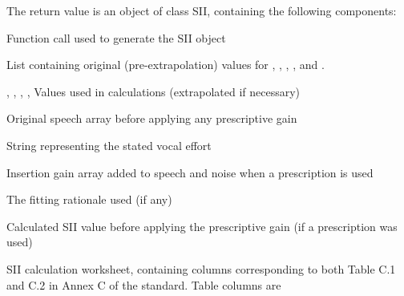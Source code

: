\documentclass[letterpaper]{book}
\begin{document}
\begin{Value}
The return value is an object of class SII, containing the following
components:
\begin{ldescription}
\item[\code{call}] Function call used to generate the SII object
\item[\code{orig}] List containing original (pre-extrapolation) values for
, , , , and
.
\item[\code{speech}, \code{noise}, \code{threshold}, \code{loss}, \code{and freq}] Values used in
calculations (extrapolated if necessary)
\item[\code{unaided\_speech}] Original speech array before applying any prescriptive gain
\item[\code{vocal\_effort}] String representing the stated vocal effort
\item[\code{gain}] Insertion gain array added to speech and noise when a prescription is used
\item[\code{prescription}] The fitting rationale used (if any)
\item[\code{unaided\_sii}] Calculated SII value before applying the prescriptive gain (if a prescription was used)
\item[\code{table}] SII calculation worksheet, containing columns
corresponding to both Table C.1 and C.2 in Annex C of the
standard. Table columns are
\begin{description}


\end{description}
\end{ldescription}
\end{Value}
\end{document}
